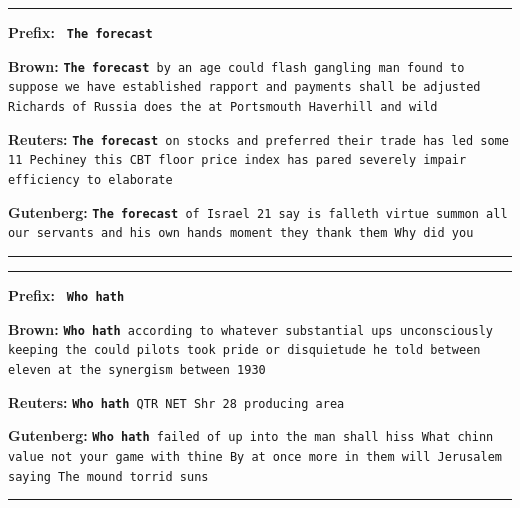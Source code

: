 \documentclass[11pt,a4paper]{article}
\begin{document}
\rule{0.49\textwidth}{0.4pt}
\label{forecast_ex}
\textbf{Prefix:} \texttt{ \textbf{The forecast} }
\vspace{1mm}

\textbf{Brown:} \texttt{\textbf{The forecast} by an age could flash gangling man found to suppose we have established rapport and payments shall be adjusted Richards of Russia does the at Portsmouth Haverhill and wild}
\vspace{1mm}

\textbf{Reuters:}  \texttt{\textbf{The forecast} on stocks and preferred their trade has led some 11 Pechiney this CBT floor price index has pared severely impair efficiency to elaborate}
\vspace{1mm}

\textbf{Gutenberg:} \texttt{\textbf{The forecast} of Israel 21 say is falleth virtue summon all our servants and his own hands moment they thank them Why did you}

\rule{0.49\textwidth}{0.4pt}



\rule{0.49\textwidth}{0.4pt}
\label{hath_ex}
\textbf{Prefix:} \texttt{ \textbf{Who hath} }
\vspace{1mm}

\textbf{Brown:}  \texttt{\textbf{Who hath} according to whatever substantial ups unconsciously keeping the could pilots took pride or disquietude he told between eleven at the synergism between 1930}
\vspace{1mm}

\textbf{Reuters:}    \texttt{\textbf{Who hath} QTR NET Shr   28 producing area}
\vspace{1mm}

\textbf{Gutenberg:} \texttt{\textbf{Who hath} failed of up into the man shall hiss What chinn value not your game with thine By at once more in them will Jerusalem saying The mound torrid suns}

\rule{0.49\textwidth}{0.4pt}

\end{document}
